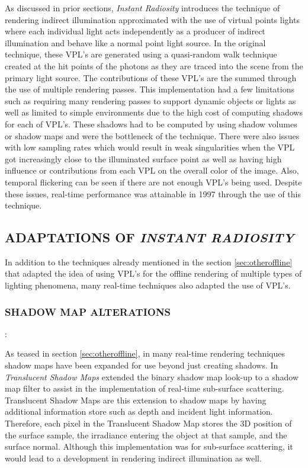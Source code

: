 As discussed in prior sections, \textit{Instant Radiosity} introduces the technique of rendering indirect illumination approximated with the use of virtual points lights where each individual light acts independently as a producer of indirect illumination and behave like a normal point light source.  In the original technique, these VPL's are generated using a quasi-random walk technique created at the hit points of the photons as they are traced into the scene from the primary light source.  The contributions of these VPL's are the summed through the use of multiple rendering passes.  This implementation had a few limitations such as requiring many rendering passes to support dynamic objects or lights as well as limited to simple environments due to the high cost of computing shadows for each of VPL's.  These shadows had to be computed by using shadow volumes or shadow maps and were the bottleneck of the technique.  There were also issues with low sampling rates which would result in weak singularities when the VPL got increasingly close to the illuminated surface point as well as having high influence or contributions from each VPL on the overall color of the image.  Also, temporal flickering can be seen if there are not enough VPL's being used.  Despite these issues, real-time performance was attainable in 1997 through the use of this technique.

\subsection{ADAPTATIONS OF \textit{INSTANT RADIOSITY}}

In addition to the techniques already mentioned in the section \ref{sec:otheroffline} that adapted the idea of using VPL's for the offline rendering of multiple types of lighting phenomena, many real-time techniques also adapted the use of VPL's.  

\subsubsection{SHADOW MAP ALTERATIONS}: 

As teased in section \ref{sec:otheroffline}, in many real-time rendering techniques shadow maps have been expanded for use beyond just creating shadows.  In \textit{Translucent Shadow Maps} \cite{Dachsbacher2003} extended the binary shadow map look-up to a shadow map filter to assist in the implementation of real-time sub-surface scattering.  Translucent Shadow Maps are this extension to shadow maps by having additional information store such as depth and incident light information.  Therefore, each pixel in the Translucent Shadow Map stores the 3D position of the surface sample, the irradiance entering the object at that sample, and the surface normal.  Although this implementation was for sub-surface scattering, it would lead to a development in rendering indirect illumination as well.

